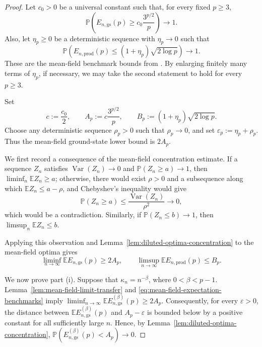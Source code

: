 \documentclass[12pt]{article}
\newcommand{\E}{\mathbb{E}}
\renewcommand{\P}{\mathbb{P}}
\begin{document}
\begin{appendix}
\begin{proof}
Let \(c_0>0\) be a universal constant such that, for every fixed
\(p\ge3\),
\[
    \P\left(
        E_{n,\mathrm{gs}}(p)
        \ge
        c_0\frac{3^{p/2}}{p}
    \right)
    \to 1.
\]
Also, let \(\eta_p\ge0\) be a deterministic sequence with
\(\eta_p\to0\) such that
\[
    \P(
        E_{n,\mathrm{prod}}(p)
        \le
        (1+\eta_p)\sqrt{2\log p}
    )
    \to 1.
\]
These are the mean-field benchmark bounds from
\cite{anschuetz2025bounds,anschuetz2025strongly}. By enlarging finitely
many terms of \(\eta_p\), if necessary, we may take the second statement
to hold for every \(p\ge3\).

Set
\[
    c:=\frac{c_0}{2},
    \qquad
    A_p:=c\frac{3^{p/2}}{p},
    \qquad
    B_p:=(1+\eta_p)\sqrt{2\log p}.
\]
Choose any deterministic sequence \(\rho_p>0\) such that
\(\rho_p\to0\), and set $\varepsilon_p:=\eta_p+\rho_p$. Thus the mean-field ground-state lower bound is \(2A_p\).

We first record a consequence of the mean-field concentration estimate.
If a sequence \(Z_n\) satisfies
\(\operatorname{Var}(Z_n)\to0\) and
\(\P(Z_n\ge a)\to1\), then
\(\liminf_n\E Z_n\ge a\); otherwise, there would exist \(\rho>0\) and a
subsequence along which
\(\E Z_n\le a-\rho\), and Chebyshev's inequality would give
\[
    \P(Z_n\ge a)
    \le
    \frac{\operatorname{Var}(Z_n)}{\rho^2}
    \to0,
\]
which would be a contradiction. Similarly, if
\(\P(Z_n\le b)\to1\), then
\(\limsup_n\E Z_n\le b\).

Applying this observation and
Lemma~\ref{lem:diluted-optima-concentration} to the mean-field optima
gives
\begin{equation}
    \liminf_{n\to\infty}
    \E E_{n,\mathrm{gs}}(p)
    \ge
    2A_p,
    \qquad
    \limsup_{n\to\infty}
    \E E_{n,\mathrm{prod}}(p)
    \le
    B_p.
\label{eq:mean-field-expectation-benchmarks}
\end{equation}

We now prove part \textup{(i)}. Suppose that
\(\kappa_n=n^{-\beta}\), where \(0<\beta<p-1\).
Lemma~\ref{lem:mean-field-limit-transfer} and
\eqref{eq:mean-field-expectation-benchmarks} imply $\liminf_{n\to\infty}
    \E E_{n,\mathrm{gs}}^{(\beta)}(p)
    \ge
    2A_p$. Consequently, for every \(\varepsilon>0\), the distance between
\(\E E_{n,\mathrm{gs}}^{(\beta)}(p)\) and
\(A_p-\varepsilon\) is bounded below by a positive constant for all
sufficiently large \(n\). Hence, by
Lemma~\ref{lem:diluted-optima-concentration}, $\P(
        E_{n,\mathrm{gs}}^{(\beta)}(p)
        <
        A_p)
    \to0$.
    

\end{proof}
\end{appendix}
\end{document}
